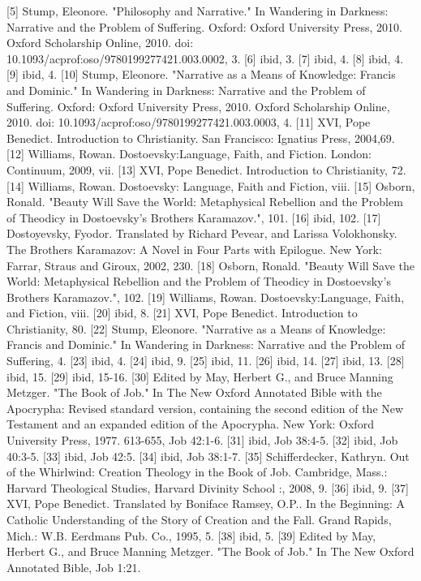 [5] Stump, Eleonore. "Philosophy and Narrative." In Wandering in Darkness: Narrative and the Problem of Suffering. Oxford: Oxford University Press, 2010. Oxford Scholarship Online, 2010. doi: 10.1093/acprof:oso/9780199277421.003.0002, 3.
[6] ibid, 3.
[7] ibid, 4.
[8] ibid, 4.
[9] ibid, 4.
[10] Stump, Eleonore. "Narrative as a Means of Knowledge: Francis and Dominic." In Wandering in Darkness: Narrative and the Problem of Suffering. Oxford: Oxford University Press, 2010. Oxford Scholarship Online, 2010. doi: 10.1093/acprof:oso/9780199277421.003.0003, 4.
[11] XVI, Pope Benedict. Introduction to Christianity. San Francisco: Ignatius Press, 2004,69.
[12] Williams, Rowan. Dostoevsky:Language, Faith, and Fiction. London: Continuum, 2009, vii.
[13] XVI, Pope Benedict. Introduction to Christianity, 72.
[14] Williams, Rowan. Dostoevsky: Language, Faith and Fiction, viii.
[15] Osborn, Ronald. "Beauty Will Save the World: Metaphysical Rebellion and the Problem of Theodicy in Dostoevsky's Brothers Karamazov.", 101.
[16] ibid, 102.
[17] Dostoyevsky, Fyodor. Translated by Richard Pevear, and Larissa Volokhonsky. The Brothers Karamazov: A Novel in Four Parts with Epilogue. New York: Farrar, Straus and Giroux, 2002, 230.
[18] Osborn, Ronald. "Beauty Will Save the World: Metaphysical Rebellion and the Problem of Theodicy in Dostoevsky's Brothers Karamazov.", 102.
[19] Williams, Rowan. Dostoevsky:Language, Faith, and Fiction, viii.
[20] ibid, 8.
[21] XVI, Pope Benedict. Introduction to Christianity, 80.
[22] Stump, Eleonore. "Narrative as a Means of Knowledge: Francis and Dominic." In Wandering in Darkness: Narrative and the Problem of Suffering, 4.
[23] ibid, 4.
[24] ibid, 9.
[25] ibid, 11.
[26] ibid, 14.
[27] ibid, 13.
[28] ibid, 15.
[29] ibid, 15-16.
[30] Edited by May, Herbert G., and Bruce Manning Metzger. "The Book of Job." In The New Oxford Annotated Bible with the Apocrypha: Revised standard version, containing the second edition of the New Testament and an expanded edition of the Apocrypha. New York: Oxford University Press, 1977. 613-655, Job 42:1-6.
[31] ibid, Job 38:4-5.
[32] ibid, Job 40:3-5.
[33] ibid, Job 42:5.
[34] ibid, Job 38:1-7.
[35] Schifferdecker, Kathryn. Out of the Whirlwind: Creation Theology in the Book of Job. Cambridge, Mass.: Harvard Theological Studies, Harvard Divinity School :, 2008, 9.
[36] ibid, 9.
[37] XVI, Pope Benedict. Translated by Boniface Ramsey, O.P.. In the Beginning: A Catholic Understanding of the Story of Creation and the Fall. Grand Rapids, Mich.: W.B. Eerdmans Pub. Co., 1995, 5.
[38] ibid, 5.
[39] Edited by May, Herbert G., and Bruce Manning Metzger. "The Book of Job." In The New Oxford Annotated Bible, Job 1:21.
